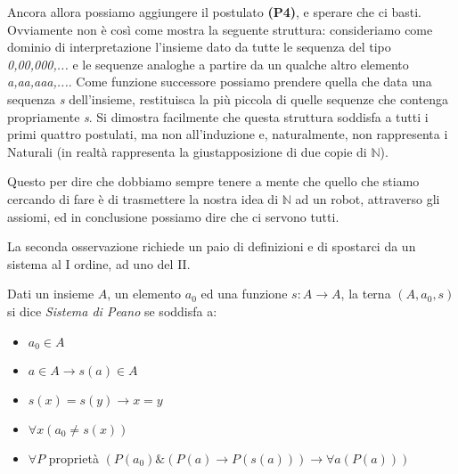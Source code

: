 Ancora allora possiamo aggiungere il postulato \textbf{(P4)}, e sperare che ci basti.
Ovviamente non \`e cos\`i come mostra la seguente struttura:
consideriamo come dominio di interpretazione l'insieme dato da tutte le sequenza del tipo \textit{0,00,000,...}
e le sequenze analoghe a partire da un qualche altro elemento \textit{a,aa,aaa,...}. Come funzione successore possiamo prendere quella che data una sequenza \textit{s} dell'insieme, restituisca la pi\`u piccola di quelle sequenze che contenga propriamente \textit{s}. Si dimostra facilmente che questa struttura soddisfa a tutti i primi quattro postulati, ma non all'induzione e, naturalmente, non rappresenta i Naturali (in realt\`a rappresenta la giustapposizione di due copie di $\mathbb{N}$).

Questo per dire che dobbiamo sempre tenere a mente che quello che stiamo cercando di fare \`e di trasmettere la nostra idea di $\mathbb{N}$ ad un robot, attraverso gli assiomi, ed in conclusione possiamo dire che ci servono tutti.

\vspace{0.3cm}
La seconda osservazione richiede un paio di definizioni e di spostarci da un sistema al I ordine, ad uno del II.
\begin{defi}
Dati un insieme $A$, un elemento $a_0$ ed una funzione $s:A\rightarrow A$, la terna $(A,a_0,s)$ si dice \textit{Sistema di Peano} se soddisfa a:
\begin{itemize}
\item $ a_0 \in A $
\item $ a\in A \rightarrow s(a) \in A $
\item $ s(x)=s(y)\rightarrow x=y $
\item $ \forall x (a_0\neq s(x)) $
\item $ \forall P $ propriet\`a $ (P(a_0)\&(P(a)\rightarrow P(s(a)))\rightarrow \forall a(P(a))) $
\end{itemize}
\end{defi}

